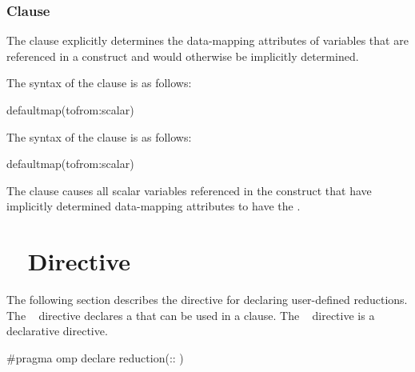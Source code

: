 {{{{\begin{samepage}
\begin{itemize}
\fortranspecificend
\end{itemize}
\end{samepage}





\subsubsection{ Clause}
\label{subsubsec:defaultmap clause}
\summary
The  clause explicitly determines the data-mapping attributes of variables that 
are referenced in a  construct and would otherwise be 
implicitly determined.

\syntax
\ccppspecificstart
The syntax of the  clause is as follows:

\begin{boxedcode}
defaultmap(tofrom:scalar)
\end{boxedcode}
\ccppspecificend

\fortranspecificstart
The syntax of the  clause is as follows:

\begin{boxedcode}
defaultmap(tofrom:scalar)
\end{boxedcode}
\fortranspecificend

\descr
The  clause causes all scalar variables
referenced in the construct that have implicitly determined data-mapping
attributes to have the  .








\section{~ Directive}
\label{sec:declare reduction Directive}
\summary
The following section describes the directive for declaring user-defined reductions. The 
~ directive declares a  that can be used in a 
 clause. The ~ directive is a declarative directive.

\syntax
\cspecificstart
\begin{boxedcode}
\#pragma omp declare reduction(:: 
)
\end{boxedcode}

}}}}
